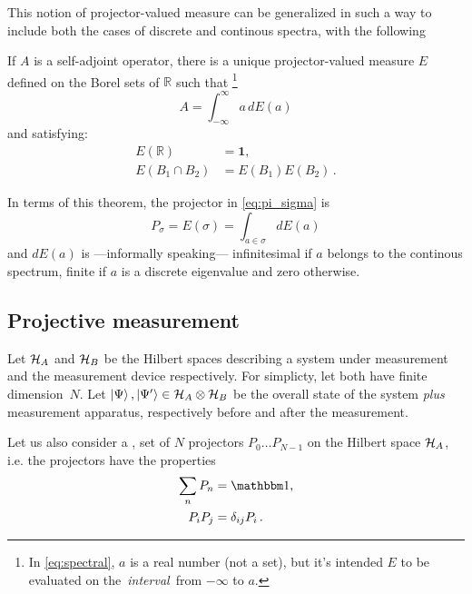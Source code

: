 This notion of projector-valued measure can be generalized
in such a way to include both the cases of discrete and continous spectra,
with the following \parencite{VonNeumann, Ballentine}
\begin{theorem}
  If $A$ is a self-adjoint operator,
  there is a unique projector-valued measure $E$
  defined on the Borel sets of $\mathbb{R}$
  such that
  \footnote{
    In \eqref{eq:spectral}, $a$ is a real number (not a set),
    but it's intended $E$ to be evaluated
    on the~\emph{interval}~from $-\infty$ to $a$.
  }
  \begin{equation}\label{eq:spectral}
    A=\int_{-\infty}^{\infty}a\, dE(a)
  \end{equation}
  and satisfying:
  \begin{align*}
    E(\mathbb{R})       & =\mathbf{1},\\
    E(B_{1}\cap B_{2}) & =E(B_{1})E(B_{2})\,.
  \end{align*}
\end{theorem}

In terms of this theorem, the projector in \eqref{eq:pi_sigma} is
\begin{equation}\label{eq:P_sigma_spectral}
  P_{\sigma} = E(\sigma) = \int_{a\in\sigma}dE(a)
\end{equation}
and $dE(a)$ is
---informally speaking---
infinitesimal if $a$ belongs to the continous spectrum,
finite if $a$ is a discrete eigenvalue
and zero otherwise.


\subsection{Projective measurement}

Let $\mathcal{H}_A$ and $\mathcal{H}_B$ be the Hilbert spaces describing
a system under measurement and the measurement device respectively.
For simplicty, let both have finite di\-mension~$N$.
Let $\ket{\Psi}, \ket{\Psi'} \in \mathcal{H}_{A} \otimes \mathcal{H}_{B}$
be the overall state of the
system \emph{plus} measurement apparatus, 
respectively before and after the measurement.

Let us also consider a ,  set of $N$ projectors
$P_0 \dots P_{N-1}$ on the Hilbert space $\mathcal{H}_A$,
i.e. the projectors have the properties
\begin{align}
  \sum_n P_n  &= \idop \text{,}\\
  P_i P_j     &= \delta_{ij}P_i \, \text{.}
\end{align}

